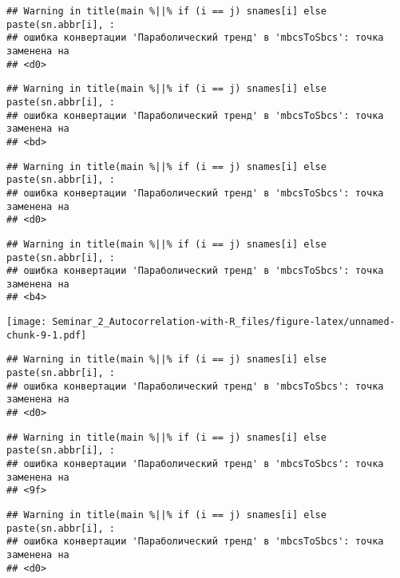 \documentclass[
]{article}
\newenvironment{Shaded}{\begin{snugshade}}{\end{snugshade}}
\newcommand{\AttributeTok}[1]{\textcolor[rgb]{0.13,0.29,0.53}{#1}}
\newcommand{\DecValTok}[1]{\textcolor[rgb]{0.00,0.00,0.81}{#1}}
\newcommand{\FunctionTok}[1]{\textcolor[rgb]{0.13,0.29,0.53}{\textbf{#1}}}
\newcommand{\NormalTok}[1]{#1}
\newcommand{\SpecialCharTok}[1]{\textcolor[rgb]{0.81,0.36,0.00}{\textbf{#1}}}
\newcommand{\StringTok}[1]{\textcolor[rgb]{0.31,0.60,0.02}{#1}}
\begin{document}
\begin{verbatim}
## Warning in title(main %||% if (i == j) snames[i] else paste(sn.abbr[i], :
## ошибка конвертации 'Параболический тренд' в 'mbcsToSbcs': точка заменена на
## <d0>
\end{verbatim}

\begin{verbatim}
## Warning in title(main %||% if (i == j) snames[i] else paste(sn.abbr[i], :
## ошибка конвертации 'Параболический тренд' в 'mbcsToSbcs': точка заменена на
## <bd>
\end{verbatim}

\begin{verbatim}
## Warning in title(main %||% if (i == j) snames[i] else paste(sn.abbr[i], :
## ошибка конвертации 'Параболический тренд' в 'mbcsToSbcs': точка заменена на
## <d0>
\end{verbatim}

\begin{verbatim}
## Warning in title(main %||% if (i == j) snames[i] else paste(sn.abbr[i], :
## ошибка конвертации 'Параболический тренд' в 'mbcsToSbcs': точка заменена на
## <b4>
\end{verbatim}

\texttt{[image: Seminar\_2\_Autocorrelation-with-R\_files/figure-latex/unnamed-chunk-9-1.pdf]}

\begin{Shaded}
\end{Shaded}

\begin{verbatim}
## Warning in title(main %||% if (i == j) snames[i] else paste(sn.abbr[i], :
## ошибка конвертации 'Параболический тренд' в 'mbcsToSbcs': точка заменена на
## <d0>
\end{verbatim}

\begin{verbatim}
## Warning in title(main %||% if (i == j) snames[i] else paste(sn.abbr[i], :
## ошибка конвертации 'Параболический тренд' в 'mbcsToSbcs': точка заменена на
## <9f>
\end{verbatim}

\begin{verbatim}
## Warning in title(main %||% if (i == j) snames[i] else paste(sn.abbr[i], :
## ошибка конвертации 'Параболический тренд' в 'mbcsToSbcs': точка заменена на
## <d0>
\end{verbatim}
\end{document}
